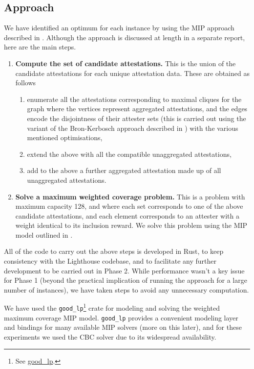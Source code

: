 \documentclass{article}
\begin{document}
\subsection{Approach}

We have identified an optimum for each instance by using the MIP approach
described in \cite{Satalia22b}. Although the approach is discussed at length
in a separate report, here are the main steps.

\begin{enumerate}
  \item \textbf{Compute the set of candidate attestations.} This is the union
  of the candidate attestations for each unique attestation data. These are
  obtained as follows
    \begin{enumerate}
      \item enumerate all the attestations corresponding to maximal cliques for
      the graph where the vertices represent aggregated attestations, and the
      edges encode the disjointness of their attester sets (this is carried
      out using the variant of the Bron-Kerbosch approach described in 
      \cite{Satalia22b}) with the various mentioned optimisations,
      \item extend the above with all the compatible unaggregated attestations,
      \item add to the above a further aggregated attestation made up of all
      unaggregated attestations.
    \end{enumerate}
  \item \textbf{Solve a maximum weighted coverage problem.} This is a problem
  with maximum capacity 128, and where each set corresponds to one of the above
  candidate attestations, and each element corresponds to an attester with a
  weight identical to its inclusion reward. We solve this problem using the MIP
  model outlined in \cite{Satalia22b}.
\end{enumerate}

\noindent
All of the code to carry out the above steps is developed in Rust, to keep
consistency with the Lighthouse codebase, and to facilitate any further
development to be carried out in Phase 2.  While performance wasn't a key issue
for Phase 1 (beyond the practical implication of running the approach for a
large number of instances), we have taken steps to avoid any unnecessary
computation.

We have used the \texttt{good\_lp}\footnote{See
\href{https://crates.io/crates/good_lp}{good\_lp}.} crate for modeling and
solving the weighted maximum coverage MIP model. \texttt{good\_lp} provides a
convenient modeling layer and bindings for many available MIP solvers (more on
this later), and for these experiments we used the CBC solver \cite{Forrest05}
due to its widespread availability.
\end{document}
